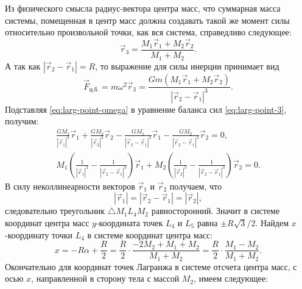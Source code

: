 Из физического смысла радиус-вектора центра масс, что суммарная масса системы, помещенная в центр масс должна создавать такой же момент силы относительно произвольной точки, как вся система, справедливо следующее:
\begin{equation*}
	\vec{r}_3 = \frac{M_1 \vec{r}_1 + M_2 \vec{r}_2}{M_1 + M_2}.
	\label{eq:larg-point-r_3}
\end{equation*}
А так как $| \vec{r}_2 - \vec{r}_1| = R$, то выражение для силы инерции принимает вид
\begin{equation}
	\vec{F}_\text{ц.б.} = m \omega^2 \vec{r}_3 = \frac{ G m (M_1 \vec{r}_1 + M_2 \vec{r}_2)}{\left| \vec{r}_2 - \vec{r}_1 \right|^3}.
	\label{eq:larg-point-omega}
\end{equation}
Подставляя \eqref{eq:larg-point-omega} в уравнение баланса сил \eqref{eq:larg-point-3}, получим:
\begin{gather*}
	\frac{G M_1}{\left|\vec{r}_1 \right|^3 } \vec{r}_1 + \frac{G M_2}{\left| \vec{r}_2 \right|^3} \vec{r}_2 - \frac{G M_1}{\left|\vec{r}_2 - \vec{r}_1 \right|^3 } \vec{r}_1 - \frac{G M_2}{\left| \vec{r}_2 - \vec{r}_1 \right|^3} \vec{r}_2 = 0,\\
	M_1 \left(\frac{1}{\left| \vec{r}_1 \right|^3} - \frac{1}{\left|\vec{r}_2 - \vec{r}_1 \right|^3} \right) \vec{r}_1 + M_2 \left(\frac{1}{\left| \vec{r}_2 \right|^3} - \frac{1}{\left|\vec{r}_2 - \vec{r}_1 \right|^3} \right) \vec{r}_2 = 0.
\end{gather*}
В силу неколлинеарности векторов $\vec{r}_1$ и $\vec{r}_2$ получаем, что
\begin{equation}
	|\vec{r}_1| = |\vec{r}_2 - \vec{r}_1 | = |\vec{r}_2|,
\end{equation}
следовательно треугольник $\triangle M_1 L_4 M_2$ равносторонний. Значит в системе координат центра масс $y$-координата точек $L_4$ и $L_5$ равна $\pm R\sqrt{3}/2$. Найдем $x$-координату точки $L_4$ в системе координат центра масс:
\begin{equation*}
	x = -R\alpha + \frac{R}{2} = \frac{R}{2} \cdot \frac{-2 M_2 + M_1 + M_2}{M_1 + M_2} = \frac{R}{2} \cdot \frac{M_1 - M_2}{M_1 + M_2}.
\end{equation*}
Окончательно для координат точек Лагранжа в системе отсчета центра масс, с осью $x$, направленной в сторону тела с массой $M_2$, имеем следующее:
